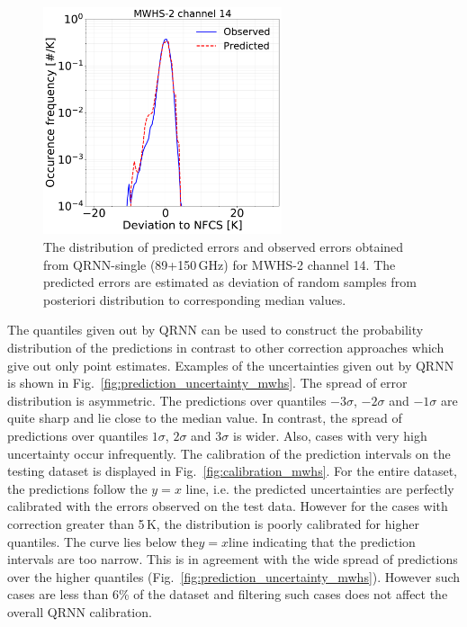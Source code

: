 \documentclass[amt, manuscript]{copernicus}
\begin{document}
\begin{figure}[t]
	\includegraphics[width=70mm]{Figures/deviation_posterior_mwhs_samples_14.pdf}	
	\caption{The distribution of predicted errors and observed errors  obtained from QRNN-single (89+150\,GHz) for MWHS-2 channel 14. The predicted errors are estimated as deviation of random samples from posteriori distribution to corresponding median values.}
	\label{fig:predicted_errors_mwhs}	
\end{figure}

The quantiles given out by QRNN can be used to construct the probability distribution of the predictions in contrast to other correction approaches which give out only point estimates. Examples of the uncertainties given out by QRNN is shown in Fig.~\ref{fig:prediction_uncertainty_mwhs}. The spread of error distribution is asymmetric. The predictions over quantiles $-3\sigma$, $-2\sigma$ and $-1\sigma$ are quite sharp and lie close to the median value. In contrast, the spread of predictions over quantiles $1\sigma$, $2\sigma$ and $3\sigma$ is wider. Also, cases with very high uncertainty occur infrequently. The calibration of the prediction intervals on the testing dataset is displayed in Fig.~\ref{fig:calibration_mwhs}. For the entire dataset, the predictions follow the $y=x$ line, i.e. the predicted uncertainties are perfectly calibrated with the errors observed on the test data. However for the cases with correction greater than 5\,K, the distribution is poorly calibrated for higher quantiles. The curve lies below the$y =x$line indicating that the prediction intervals are too narrow. This is in agreement with the wide spread of predictions over the  higher quantiles (Fig.~\ref{fig:prediction_uncertainty_mwhs}). However such cases are less than 6\% of the dataset and filtering such cases does not affect the overall QRNN calibration.
\end{document}
